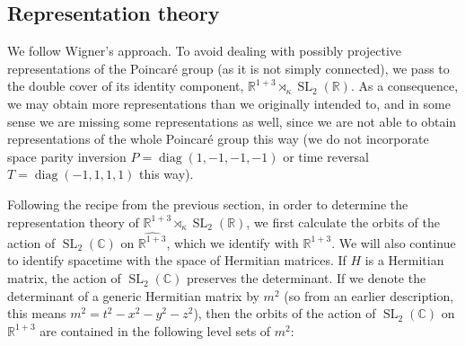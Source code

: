 \documentclass[11pt,leqno]{article}
\theoremstyle{plain}
\theoremstyle{definition}
\numberwithin{equation}{section}
\numberwithin{lem}{section}
\DeclareMathOperator{\diag}{diag}
\DeclareMathOperator{\SL}{SL}
\begin{document}
\subsection{Representation theory}
We follow Wigner's approach. To avoid dealing with possibly projective representations of the Poincar\'e group (as it is not simply connected), we pass to the double cover of its identity component, $\mathbb R^{1+3}\rtimes_\kappa\SL_2(\mathbb R)$. As a consequence, we may obtain more representations than we originally intended to, and in some sense we are missing some representations as well, since we are not able to obtain representations of the whole Poincar\'e group this way (we do not incorporate space parity inversion $P = \diag(1,-1,-1,-1)$ or time reversal $T = \diag(-1,1,1,1)$ this way). 

Following the recipe from the previous section, in order to determine the representation theory of $\mathbb R^{1+3}\rtimes_\kappa\SL_2(\mathbb R)$, we first calculate the orbits of the action of $\SL_2(\mathbb C)$ on $\widehat{\mathbb R^{1+3}}$, which we identify with $\mathbb R^{1+3}$. We will also continue to identify spacetime with the space of Hermitian matrices. If $H$ is a Hermitian matrix, the action of $\SL_2(\mathbb C)$ preserves the determinant. If we denote the determinant of a generic Hermitian matrix by $m^2$ (so from an earlier description, this means $m^2 = t^2-x^2-y^2-z^2$), then the orbits of the action of $\SL_2(\mathbb C)$ on $\mathbb R^{1+3}$ are contained in the following level sets of $m^2$:
\end{document}

